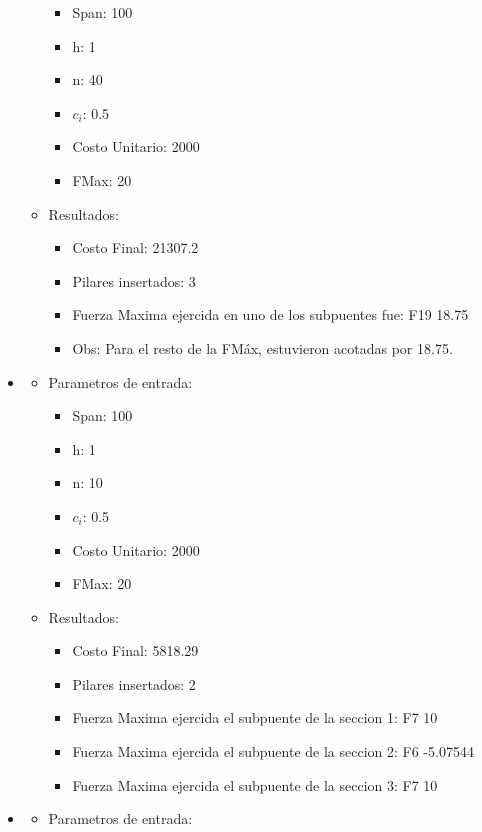 \begin{itemize}
\begin{itemize}
	  \begin{itemize}
	    \item Span: 100
	    \item h: 1
	    \item n: 40
	    \item $c_i$: 0.5
	    \item Costo Unitario: 2000
	    \item FMax: 20
	  \end{itemize}
      \item Resultados:
	  \begin{itemize}
	    \item Costo Final: 21307.2
	    \item Pilares insertados: 3
	    \item Fuerza Maxima ejercida en uno de los subpuentes fue: F19 18.75
	    \item Obs: Para el resto de la FM\'ax, estuvieron acotadas por 18.75.
	  \end{itemize}
      \end{itemize}
\item
  \begin{itemize}
    \item Parametros de entrada:
	  \begin{itemize}
	    \item Span: 100
	    \item h: 1
	    \item n: 10
	    \item $c_i$: 0.5
	    \item Costo Unitario: 2000
	    \item FMax: 20
	  \end{itemize}
      \item Resultados:
	  \begin{itemize}
	    \item Costo Final: 5818.29
	    \item Pilares insertados: 2
	    \item Fuerza Maxima ejercida el subpuente de la seccion 1: F7 10
	    \item Fuerza Maxima ejercida el subpuente de la seccion 2: F6 -5.07544
	    \item Fuerza Maxima ejercida el subpuente de la seccion 3: F7 10
	  \end{itemize}
      \end{itemize}	
\item
  \begin{itemize}
    \item Parametros de entrada:

\end{itemize}
\end{itemize}
